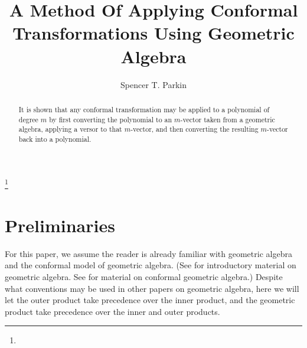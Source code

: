 \documentclass{ecgd-l}
\theoremstyle{definition}
\theoremstyle{remark}
\numberwithin{equation}{section}
\begin{document}
\title{A Method Of Applying Conformal Transformations Using Geometric Algebra}


\author{Spencer T. Parkin}
\address{Weber State University\\3848 Harrison Blvd\\Ogden, UT  84408}
\curraddr{}
\email{}
\thanks{}


\date{}

\dedicatory{}

\begin{abstract}
It is shown that any conformal transformation may be applied to a polynomial
of degree $m$
by first converting the polynomial to an $m$-vector taken from a geometric algebra,
applying a versor to that $m$-vector, and then converting the resulting $m$-vector
back into a polynomial.
\end{abstract}

\maketitle

\section{Preliminaries}

For this paper, we assume the reader is already familiar with geometric algebra and the
conformal model of geometric algebra.
(See \cite{Dorst07} for introductory material on geometric algebra.  See \cite{Dorst07,Hestenes01} for material
on conformal geometric algebra.)  Despite what conventions
may be used in other papers on geometric algebra, here we will let the outer product
take precedence over the inner product, and the geometric product take precedence
over the inner and outer products.
\end{document}
